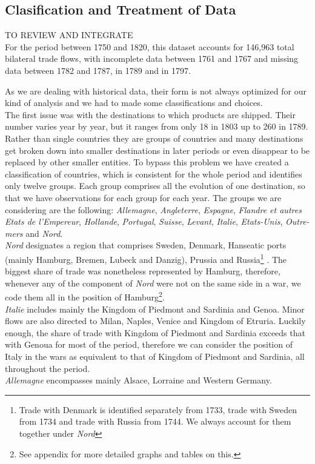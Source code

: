 \documentclass[12pt,a4paper,notitlepage,english]{article}
\begin{document}
\subsection{Clasification and Treatment of Data} \label{figures}
\begin{center}
TO REVIEW AND INTEGRATE \\
For the period between 1750 and 1820, this dataset accounts for 146,963 total bilateral trade flows, with incomplete data between 1761 and 1767 and missing data between 1782 and 1787, in 1789 and in 1797. 
\end{center}
As we are dealing with historical data, their form is not always optimized for our kind of analysis and we had to made some classifications and choices. \\
The first issue was with the destinations to which products are shipped. 
Their number varies year by year, but it ranges from only 18 in 1803 up to 260 in 1789. Rather than single countries they are groups of countries and many destinations get broken down into smaller destinations in later periods or even disappear to be replaced by other smaller entities. To bypass this problem we have created a classification of countries, which is consistent for the whole period and identifies only twelve groups. Each group comprises all the evolution of one destination, so that we have observations for each group for each year. The groups we are considering are the following: \textit{Allemagne}, \textit{Angleterre}, \textit{Espagne}, \textit{Flandre et autres Etats de l'Empereur}, \textit{Hollande}, \textit{Portugal}, \textit{Suisse}, \textit{Levant}, \textit{Italie},  \textit{Etats-Unis}, \textit{Outre-mers} and \textit{Nord}. \\
\textit{Nord} designates a region that comprises Sweden, Denmark, Hanseatic ports (mainly Hamburg, Bremen, Lubeck and Danzig), Prussia and Russia\footnote{Trade with Denmark is identified separately from 1733, trade with Sweden from 1734 and trade with Russia from 1744. We always account for them together under \textit{Nord}} \citep{charles2018cross}. The biggest share of trade was nonetheless represented by Hamburg, therefore, whenever any of the component of \textit{Nord} were not on the same side in a war, we code them all in the position of Hamburg\footnote{See appendix for more detailed graphs and tables on this.}. \\
\textit{Italie} includes mainly the Kingdom of Piedmont and Sardinia and Genoa. Minor flows are also directed to Milan, Naples, Venice and Kingdom of Etruria. Luckily enough, the share of trade with Kingdom of Piedmont and Sardinia exceeds that with Genoua for most of the period, therefore we can consider the position of Italy in the wars as equivalent to that of Kingdom of Piedmont and Sardinia, all throughout the period.\\
\textit{Allemagne} encompasses mainly Alsace, Lorraine and Western Germany.
\end{document}
